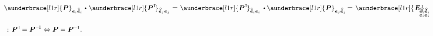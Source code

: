 \nopagebreak\en{\vspace{-0.8em}}\ru{\vspace{-0.25em}}
\begin{equation}\label{orthogonalityofrotationtensor}
\aunderbrace[l1r]{\bm{P}}_{\bm{e}_i \mathcircabove{\bm{e}}_i} \hspace{.1em} \dotp \hspace{.1em} \aunderbrace[l1r]{\bm{P}^{\T}\hspace{-0.2em}}_{\mathcircabove{\bm{e}}_j \bm{e}_j}
\hspace{.2ex} = \hspace{.2ex}
\aunderbrace[l1r]{\bm{P}^{\T}\hspace{-0.2em}}_{\mathcircabove{\bm{e}}_i \bm{e}_i} \hspace{.2em} \dotp \aunderbrace[l1r]{\bm{P}}_{\bm{e}_j \mathcircabove{\bm{e}}_j}
\hspace{-0.2ex} = \hspace{.3ex}
\aunderbrace[l1r]{\hspace{.2ex}\bm{E}\hspace{.2ex}}_{\mathclap{\begin{subarray}{l} \mathcircabove{\bm{e}}_i \mathcircabove{\bm{e}}_i \\ \bm{e}_i \bm{e}_i \end{subarray}}}
\hspace{.1em} ,
\end{equation}

\vspace{-0.1em} \noindent {}   ~: ${\bm{P}^{\T} \hspace{-0.32ex}= \bm{P}^{\expminusone} \Leftrightarrow \bm{P} = \bm{P}^{\expminusT}\hspace{-0.25ex}}$.

